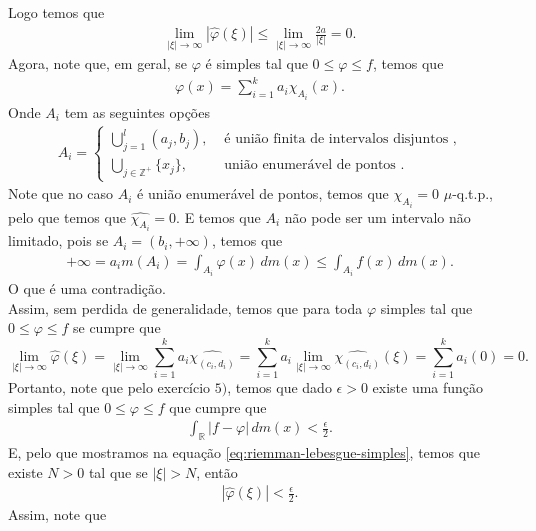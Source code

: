 \begin{homeworkProblem}[6]
\begin{solution}
    Logo temos que
    \begin{align*}
      \lim_{|\xi| \to \infty}|\hat{\varphi}(\xi)|\leq \lim_{|\xi| \to \infty}\frac{2a}{|\xi|}=0.
    \end{align*}
    Agora, note que, em geral, se $\varphi$ é simples tal que $0\leq\varphi\leq f$, temos que
    \begin{align*}
      \varphi(x)=\sum_{i=1}^{k}a_i\chi_{A_i}(x).
    \end{align*}
    Onde $A_i$ tem as seguintes opções
    \begin{align*}
      A_i=\begin{cases}
        \bigcup_{j=1}^{l}(a_j,b_j), &\text{ é união finita de intervalos disjuntos }  \text{,} \\
        \bigcup_{j\in \mathbb{Z}^{+}}\{x_j\}, &\text{ união enumerável de pontos }.
      \end{cases}
    \end{align*}
    Note que no caso $A_i$ é união enumerável de pontos, temos que $\chi_{A_i}=0$ $\mu$-q.t.p., pelo que temos que $\hat{\chi_{A_i}}=0$. E temos que $A_i$ não pode ser um intervalo não limitado, pois se $A_i=(b_i,+\infty)$, temos que
    \begin{align*}
      +\infty=a_i m(A_i)=\int_{A_i}\varphi(x)\,dm(x)\leq \int_{A_i}f(x)\,dm(x).
    \end{align*}
    O que é uma contradição.\\
    Assim, sem perdida de generalidade, temos que para toda $\varphi$ simples tal que $0\leq \varphi\leq f$ se cumpre que
    \begin{equation}\label{eq:riemman-lebesgue-simples}
      \lim_{|\xi| \to \infty}\hat{\varphi}(\xi) = \lim_{|\xi| \to \infty}\sum_{i=1}^{k}a_i \hat{\chi_{(c_i,d_i)}}=\sum_{i=1}^{k}a_i \lim_{|\xi| \to \infty}\hat{\chi_{(c_i,d_i)}}(\xi)=\sum_{i=1}^{k}a_i(0)=0.
    \end{equation}
    Portanto, note que pelo exercício $5)$, temos que dado $\epsilon>0$ existe uma função simples tal que $0\leq \varphi\leq f$ que cumpre que
    \begin{align*}
      \int_{\mathbb{R}}|f-\varphi|\,dm(x)<\frac{\epsilon}{2}.
    \end{align*}
    E, pelo que mostramos na equação \eqref{eq:riemman-lebesgue-simples}, temos que existe $N>0$ tal que se $|\xi| >N$, então
    \begin{align*}
      |\hat{\varphi}(\xi)|<\frac{\epsilon}{2}.
    \end{align*}
    Assim, note que

\end{solution}
\end{homeworkProblem}

